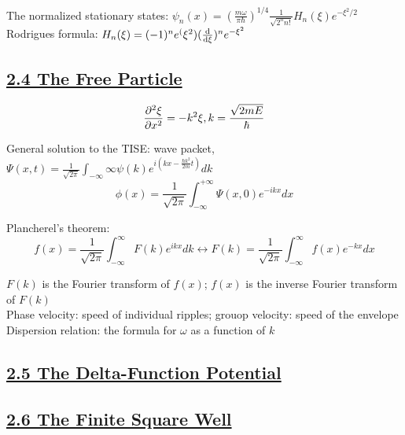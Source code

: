 The normalized stationary states: $\psi_n(x) = (\frac{m \omega}{\pi \hbar})^{1/4} \frac{1}{\sqrt{2^n n!}} H_n(\xi) e^{-\xi^2 / 2}$ \\

Rodrigues formula: $H_n(\xi) = (-1)^n e^(\xi^2) (\dv{}{\xi})^n e^{-\xi^2}$

\subsection{\underline{2.4 The Free Particle}}
$$\pdv[2]{\xi}{x} = -k^2 \xi, k = \frac{\sqrt{2mE}}{\hbar}$$

General solution to the TISE: wave packet, $\Psi(x, t) = \frac{1}{\sqrt{2\pi}} \int_{-\infty}{\infty} \psi(k) e^{i (kx - \frac{\hbar k^2}{2m} t)} dk$ \\
$$\phi(x) = \frac{1}{\sqrt{2 \pi}} \int_{-\infty}^{+\infty} \Psi(x, 0) e^{-ikx} dx$$

Plancherel's theorem: $$f(x) = \frac{1}{\sqrt{2 \pi}} \int_{-\infty}^{\infty} F(k) e^{ikx} dk \leftrightarrow F(k) = \frac{1}{\sqrt{2\pi}} \int_{-\infty}^{\infty} f(x) e^{-kx} dx$$

$F(k)$ is the Fourier transform of $f(x)$; $f(x)$ is the inverse Fourier transform of $F(k)$ \\

Phase velocity: speed of individual ripples; grouop velocity: speed of the envelope \\

Dispersion relation: the formula for $\omega$ as a function of $k$

\subsection{\underline{2.5 The Delta-Function Potential}}

\subsection{\underline{2.6 The Finite Square Well}}


